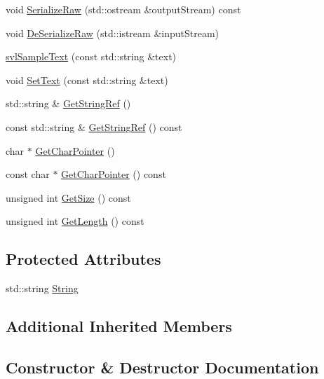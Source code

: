 \begin{DoxyCompactItemize}
\item 
void \hyperlink{classsvl_sample_text_a477440c4692d1e273517182a357194fa}{Serialize\+Raw} (std\+::ostream \&output\+Stream) const 
\item 
void \hyperlink{classsvl_sample_text_a47c1fb6879865f5036169fb821d4953c}{De\+Serialize\+Raw} (std\+::istream \&input\+Stream)
\item 
\hyperlink{classsvl_sample_text_afd138ae89a26579534a74b756f2fbf55}{svl\+Sample\+Text} (const std\+::string \&text)
\item 
void \hyperlink{classsvl_sample_text_aae2e951cb26cb00efd734e500bd72854}{Set\+Text} (const std\+::string \&text)
\item 
std\+::string \& \hyperlink{classsvl_sample_text_a4d65efeaa8c5e134798d1d1a4d78a100}{Get\+String\+Ref} ()
\item 
const std\+::string \& \hyperlink{classsvl_sample_text_a00b1c821b851248db6b27818d4171c24}{Get\+String\+Ref} () const 
\item 
char $\ast$ \hyperlink{classsvl_sample_text_acf83eb3b85222acded478d10c2c7bf4f}{Get\+Char\+Pointer} ()
\item 
const char $\ast$ \hyperlink{classsvl_sample_text_a370564e67fb7068bf48650ffab7d8fcf}{Get\+Char\+Pointer} () const 
\item 
unsigned int \hyperlink{classsvl_sample_text_a9aa86da7d78065949de0c8dbeb29903c}{Get\+Size} () const 
\item 
unsigned int \hyperlink{classsvl_sample_text_a724aa4b3005bc79c0850d103254b8686}{Get\+Length} () const 
\end{DoxyCompactItemize}
\subsection*{Protected Attributes}
\begin{DoxyCompactItemize}
\item 
std\+::string \hyperlink{classsvl_sample_text_a4310fa0f9bcd891a5cae8aa91754171d}{String}
\end{DoxyCompactItemize}
\subsection*{Additional Inherited Members}


\subsection{Constructor \& Destructor Documentation}
\hypertarget{classsvl_sample_text_abc1ee0d7384c3b5973e672545b077f2c}{}
